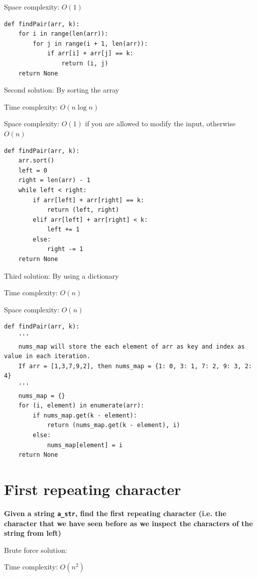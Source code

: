 \documentclass[a4paper,11pt]{book}
\begin{document}
\noindent Space complexity: $O(1)$

\begin{lstlisting}
def findPair(arr, k):
    for i in range(len(arr)):
        for j in range(i + 1, len(arr)):
            if arr[i] + arr[j] == k:
                return (i, j)
    return None
\end{lstlisting}

\noindent Second solution: By sorting the array

\noindent Time complexity: $O(n\log n)$

\noindent Space complexity: $O(1)$ if you are allowed to modify the input, otherwise $O(n)$

\begin{lstlisting}
def findPair(arr, k):
    arr.sort()
    left = 0
    right = len(arr) - 1
    while left < right:
        if arr[left] + arr[right] == k:
            return (left, right)
        elif arr[left] + arr[right] < k:
            left += 1
        else:
            right -= 1
    return None
\end{lstlisting}

\noindent Third solution: By using a dictionary

\noindent Time complexity: $O(n)$

\noindent Space complexity: $O(n)$

\begin{lstlisting}
def findPair(arr, k):
    '''
    nums_map will store the each element of arr as key and index as value in each iteration.
    If arr = [1,3,7,9,2], then nums_map = {1: 0, 3: 1, 7: 2, 9: 3, 2: 4}
    '''
    nums_map = {}
    for (i, element) in enumerate(arr):
        if nums_map.get(k - element):
            return (nums_map.get(k - element), i)
        else:
            nums_map[element] = i
    return None
\end{lstlisting}

\newpage
\section{First repeating character}

\textbf{Given a string \lstinline{a_str}, find the first repeating character (i.e. the character that we have seen before as we inspect the characters of the string from left)}
\vspace{5mm}

\noindent Brute force solution:

\noindent Time complexity: $O(n^2)$
\end{document}
